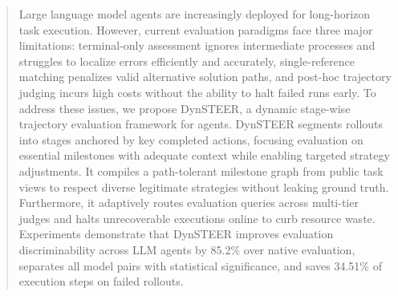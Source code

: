 \begin{abstract}
Large language model agents are increasingly deployed for long-horizon task execution. 
However, current evaluation paradigms face three major limitations: terminal-only assessment ignores intermediate processes and struggles to localize errors efficiently and accurately, single-reference matching penalizes valid alternative solution paths, and post-hoc trajectory judging incurs high costs without the ability to halt failed runs early.
To address these issues, we propose DynSTEER, a dynamic stage-wise trajectory evaluation framework for agents. 
DynSTEER segments rollouts into stages anchored by key completed actions, focusing evaluation on essential milestones with adequate context while enabling targeted strategy adjustments. 
It compiles a path-tolerant milestone graph from public task views to respect diverse legitimate strategies without leaking ground truth. 
Furthermore, it adaptively routes evaluation queries across multi-tier judges and halts unrecoverable executions online to curb resource waste. 
Experiments demonstrate that DynSTEER improves evaluation discriminability across LLM agents by 85.2\% over native evaluation, separates all model pairs with statistical significance, and saves 34.51\% of execution steps on failed rollouts.
\end{abstract}